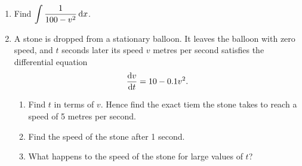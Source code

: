 \documentclass{echw}
\begin{document}

        \begin{center}
        \end{center}
    
    \problem{}
        \begin{enumerate}
            \item Find $\displaystyle\int \dfrac1{100-v^2} \mathop{\mathrm{d}x}$.
            \item A stone is dropped from a stationary balloon. It leaves the balloon with zero speed, and $t$ seconds later its speed $v$ metres per second satisfies the differential equation \[\dfrac{\mathrm{d} v}{\mathrm{d} t} = 10 - 0.1v^2.\]
            \begin{enumerate}
                \item Find $t$ in terms of $v$. Hence find the exact tiem the stone takes to reach a speed of 5 metres per second.
                \item Find the speed of the stone after 1 second.
                \item What happens to the speed of the stone for large values of $t$?
            \end{enumerate}
        \end{enumerate}
\end{document}
